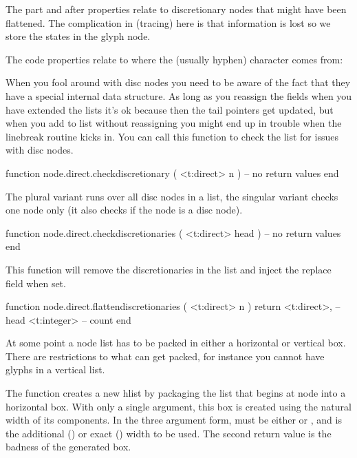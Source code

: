 The part and after properties relate to discretionary nodes that might have been
flattened. The complication in (tracing) here is that information is lost so we
store the states in the glyph node.


The code properties relate to where the (usually hyphen) character comes from:


When you fool around with disc nodes you need to be aware of the fact that they
have a special internal data structure. As long as you reassign the fields when
you have extended the lists it's ok because then the tail pointers get updated,
but when you add to list without reassigning you might end up in trouble when
the linebreak routine kicks in. You can call this function to check the list for
issues with disc nodes.

\starttyping[option=LUA]
function node.direct.checkdiscretionary ( <t:direct> n )
    -- no return values
end
\stoptyping

The plural variant runs over all disc nodes in a list, the singular variant
checks one node only (it also checks if the node is a disc node).

\starttyping[option=LUA]
function node.direct.checkdiscretionaries ( <t:direct> head )
    -- no return values
end
\stoptyping

This function will remove the discretionaries in the list and inject the replace
field when set.

\starttyping[option=LUA]
function node.direct.flattendiscretionaries ( <t:direct> n )
    return
        <t:direct>, -- head
        <t:integer> -- count
end
\stoptyping

\stopsubsection

\startsubsection[title=Packaging and dimensions]

At some point a node list has to be packed in either a horizontal or vertical
box. There are restrictions to what can get packed, for instance you cannot have
glyphs in a vertical list.


The  function creates a new hlist by packaging the list that begins
at node  into a horizontal box. With only a single argument, this box is
created using the natural width of its components. In the three argument form,
 must be either  or , and 
is the additional () or exact () width to be
used. The second return value is the badness of the generated box.

